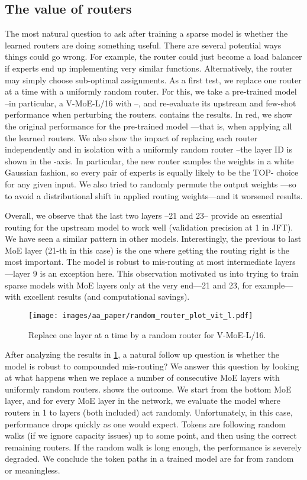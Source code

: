 \documentclass{article}
\newcommand{\abbv}{{V-MoE}}
\begin{document}
\subsection{The value of routers}
\label{app_analysis_value_routers}
The most natural question to ask after training a sparse model is whether the learned routers are doing something useful.
There are several potential ways things could go wrong.
For example, the router could just become a load balancer if experts end up implementing very similar functions.
Alternatively, the router may simply choose sub-optimal assignments.
As a first test, we replace one router at a time with a uniformly random router.
For this, we take a pre-trained model --in particular, a \abbv{}-L/16 with --, and re-evaluate its upstream and few-shot performance when perturbing the routers.
 contains the results.
In red, we show the original performance for the pre-trained model ---that is, when applying all the learned routers.
We also show the impact of replacing each router independently and in isolation with a uniformly random router --the layer ID is shown in the -axis.
In particular, the new router samples the weights in a white Gaussian fashion, so every pair of experts is equally likely to be the TOP- choice for any given input. We also tried to randomly permute the output weights ---so to avoid a distributional shift in applied routing weights---and it worsened results.


Overall, we observe that the last two layers --21 and 23-- provide an essential routing for the upstream model to work well (validation precision at 1 in JFT).
We have seen a similar pattern in other models.
Interestingly, the previous to last MoE layer (21-th in this case) is the one where getting the routing right is the most important.
The model is robust to mis-routing at most intermediate layers---layer 9 is an exception here.
This observation motivated us into trying to train sparse models with MoE layers only at the very end---21 and 23, for example---with excellent results (and computational savings).

\begin{figure}[h]
\centering
\texttt{[image: images/aa\_paper/random\_router\_plot\_vit\_l.pdf]}
\caption{Replace one layer at a time by a random router for \abbv{}-L/16.}
\label{im:random_router_one}
\end{figure}

After analyzing the results in \cref{im:random_router_one}, a natural follow up question is whether the model is robust to compounded mis-routing?
We answer this question by looking at what happens when we replace a number of consecutive MoE layers with uniformly random routers.
 shows the outcome.
We start from the bottom MoE layer, and for every MoE layer  in the network, we evaluate the model where routers in 1 to  layers (both included) act randomly.
Unfortunately, in this case, performance drops quickly as one would expect.
Tokens are following random walks (if we ignore capacity issues) up to some point, and then using the correct remaining routers. If the random walk is long enough, the performance is severely degraded.
We conclude the token paths in a trained model are far from random or meaningless.
\end{document}
